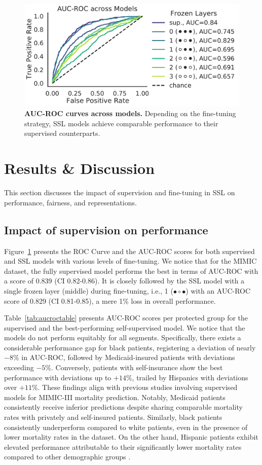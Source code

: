 \documentclass[letterpaper]{article} %
\begin{document}
\begin{figure}[b]
    \centering
    \includegraphics[width=.9\linewidth]{img/AUCROC-noCI.pdf}
    \caption{\textbf{AUC-ROC curves across models.} Depending on the fine-tuning strategy, SSL models achieve comparable performance to their supervised counterparts.}
    \label{fig:AUC-ROC}
\end{figure} %
\section{Results \& Discussion}\label{sec:results}
This section discusses the impact of supervision and fine-tuning in SSL on performance, fairness, and representations.

\subsection{Impact of supervision on performance}\label{model-evaluation}
Figure~\ref{fig:AUC-ROC} presents the ROC Curve and the AUC-ROC scores for both supervised and SSL models with various levels of fine-tuning. We notice that for the MIMIC dataset, the fully supervised model performs the best in terms of AUC-ROC with a score of 0.839 (CI 0.82-0.86). It is closely followed by the SSL model with a single frozen layer (middle) during fine-tuning, i.e., 1 ($\bullet\circ\bullet$) with an AUC-ROC score of 0.829 (CI 0.81-0.85), a mere 1\% loss in overall performance.

Table~\ref{tab:aucroctable} presents AUC-ROC scores per protected group for the supervised and the best-performing self-supervised model. We notice that the models do not perform equitably for all segments. Specifically, there exists a considerable performance gap for black patients, registering a deviation of nearly $-8\%$ in AUC-ROC, followed by Medicaid-insured patients with deviations exceeding $-5\%$. Conversely, patients with self-insurance show the best performance with deviations up to $+14\%$, trailed by Hispanics with deviations over $+11\%$.
These findings align with previous studies involving supervised models for MIMIC-III mortality prediction. Notably, Medicaid patients consistently receive inferior predictions despite sharing comparable mortality rates with privately and self-insured patients. Similarly, black patients consistently underperform compared to white patients, even in the presence of lower mortality rates in the dataset. On the other hand, Hispanic patients exhibit elevated performance attributable to their significantly lower mortality rates compared to other demographic groups \cite{roosli2022peeking}.
\end{document}
